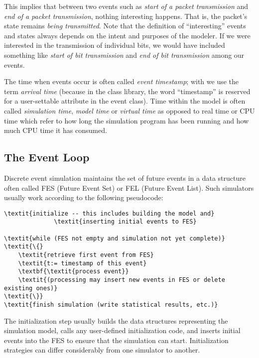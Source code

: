 This implies that between two events such as \textit{start of a packet
transmission} and \textit{end of a packet transmission}, nothing
interesting happens. That is, the packet's state remains \textit{being
transmitted}. Note that the definition of ``interesting'' events and states always
depends on the intent and purposes of the modeler.
If we were interested in the transmission of individual bits, we would
have included something like \textit{start of bit transmission} and
\textit{end of bit transmission} among our events.


The time when events occur is often called \textit{event timestamp};
 with {\opp} we use the term
\textit{arrival time} (because in the class
library, the word ``timestamp'' is reserved for a user-settable
attribute in the event class). Time within the model is often called
\textit{simulation time}, \textit{model time}
 or \textit{virtual time}
as opposed to real time or CPU time
which refer to how long the simulation program has been running and
how much CPU time it has consumed.



\subsection{The Event Loop}
\label{sec:simple-modules:event-loop}

Discrete event simulation maintains the set of future
events in a data structure often called
FES (Future Event Set) or FEL (Future Event List).
Such simulators usually work according to the following pseudocode:

\begin{Verbatim}[commandchars=\\\{\}]
\textit{initialize -- this includes building the model and}
              \textit{inserting initial events to FES}

\textit{while (FES not empty and simulation not yet complete)}
\textit{\{}
    \textit{retrieve first event from FES}
    \textit{t:= timestamp of this event}
    \textbf{\textit{process event}}
    \textit{(processing may insert new events in FES or delete existing ones)}
\textit{\}}
\textit{finish simulation (write statistical results, etc.)}
\end{Verbatim}


The initialization step usually builds the data structures
representing the simulation model, calls any user-defined
initialization code, and inserts initial events
into the FES to ensure that the simulation can start. Initialization
strategies can differ considerably from one simulator to another.


